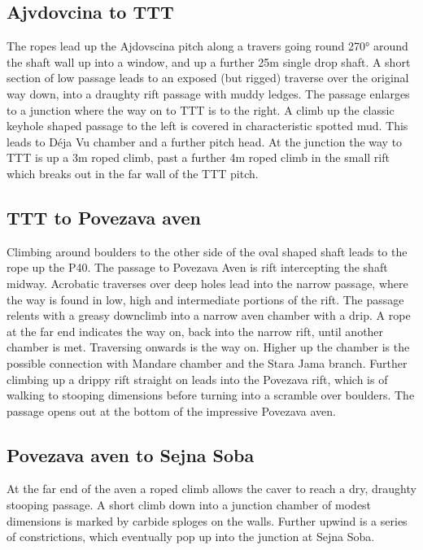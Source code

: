 \subsection{Ajvdovcina to TTT}
The ropes lead up the Ajdovscina pitch along a travers going round 270° around the shaft wall up into a window, and up a further 25m single drop shaft. A short section of low passage leads to an exposed (but rigged) traverse over the original way down, into a draughty rift passage with muddy ledges. The passage enlarges to a junction where the way on to TTT is to the right. A climb up the classic keyhole shaped passage to the left is covered in characteristic spotted mud. This leads to Déja Vu chamber and a further pitch head. At the junction the way to TTT is up a 3m roped climb, past a further 4m roped climb in the small rift which breaks out in the far wall of the TTT pitch.

\subsection{TTT to Povezava aven}
Climbing around boulders to the other side of the oval shaped shaft leads to the rope up the P40. The passage to Povezava Aven is rift intercepting the shaft midway. Acrobatic traverses over deep holes lead into the narrow passage, where the way is found in low, high and intermediate portions of the rift. The passage relents with a greasy downclimb into a narrow aven chamber with a drip. A rope at the far end indicates the way on, back into the narrow rift, until another chamber is met. Traversing onwards is the way on. Higher up the chamber is the possible connection with Mandare chamber and the Stara Jama branch. Further climbing up a drippy rift straight on leads into the Povezava rift, which is of walking to stooping dimensions before turning into a scramble over boulders. The passage opens out at the bottom of the impressive Povezava aven.

\subsection{Povezava aven to Sejna Soba}
At the far end of the aven a roped climb allows the caver to reach a dry, draughty stooping passage. A short climb down into a junction chamber of modest dimensions is marked by carbide sploges on the walls. Further upwind is a series of constrictions, which eventually pop up into the junction at Sejna Soba.




